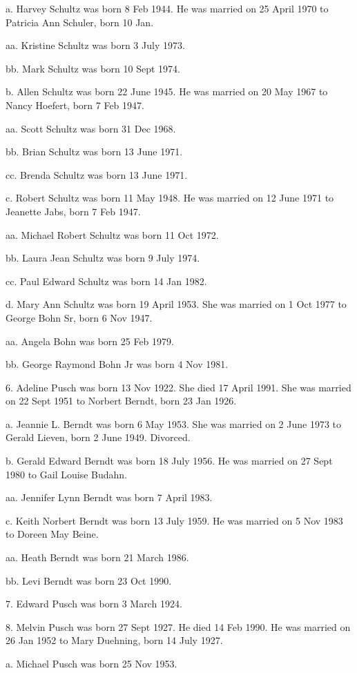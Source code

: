 \documentclass[a4paper]{article}
\begin{document}
a. Harvey Schultz was born 8 Feb 1944.  He was married on 25 April 1970  to Patricia Ann Schuler, born 10 Jan.

aa. Kristine Schultz was born 3 July 1973.  

bb. Mark Schultz was born 10 Sept 1974.

b. Allen Schultz was born 22 June 1945.  He was married on 20 May  1967 to Nancy Hoefert, born 7 Feb 1947.

aa. Scott Schultz was born 31 Dec 1968.

bb. Brian Schultz was born 13 June 1971.

cc. Brenda Schultz was born 13 June 1971.

c. Robert Schultz was born 11 May 1948.  He was married on 12 June 1971 to Jeanette Jabs, born 7 Feb 1947.  

aa. Michael Robert Schultz was born 11 Oct 1972.

bb. Laura Jean Schultz was born 9 July 1974.

cc. Paul Edward Schultz was born 14 Jan 1982.

d. Mary Ann Schultz was born 19 April 1953.  She was married on 1 Oct 1977 to George Bohn Sr, born 6 Nov 1947.

aa. Angela Bohn was born 25 Feb 1979.

bb. George Raymond Bohn Jr was born 4 Nov 1981.

6. Adeline Pusch was born 13 Nov 1922.  She died 17 April 1991.  She was married on 22 Sept 1951 to Norbert Berndt, born 23 Jan 1926.

a. Jeannie L. Berndt was born 6 May 1953.  She was married on 2 June 1973 to Gerald Lieven, born 2 June 1949.  Divorced.

b. Gerald Edward Berndt was born 18 July 1956.  He was married on 27 Sept 1980 to Gail Louise Budahn.

aa. Jennifer Lynn Berndt was born 7 April 1983.

c. Keith Norbert Berndt was born 13 July 1959.  He was married on 5 Nov 1983 to Doreen May Beine.

aa. Heath Berndt was born 21 March 1986.

bb. Levi Berndt was born 23 Oct 1990.

7. Edward Pusch was born 3 March 1924.

8. Melvin Pusch was born 27 Sept 1927.  He died 14 Feb 1990.  He was married on 26 Jan 1952 to Mary Duehning, born 14 July 1927.

a. Michael Pusch was born 25 Nov 1953.
\end{document}
